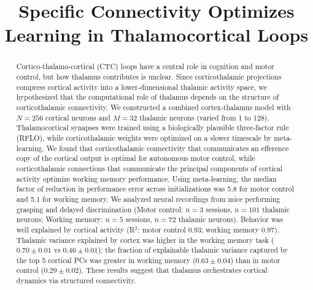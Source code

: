 \documentclass[11pt]{article}
\title{Specific Connectivity Optimizes Learning in Thalamocortical Loops}
\author{}
\date{}
\begin{document}
\maketitle

\begin{abstract}
Cortico-thalamo-cortical (CTC) loops have a central role in cognition and motor control, but how thalamus contributes is unclear. Since corticothalamic projections compress cortical activity into a lower-dimensional thalamic activity space, we hypothesized that the computational role of thalamus depends on the structure of corticothalamic connectivity. We constructed a combined cortex-thalamus model with $N = 256$ cortical neurons and $M = 32$ thalamic neurons (varied from 1 to 128). Thalamocortical synapses were trained using a biologically plausible three-factor rule (RFLO), while corticothalamic weights were optimized on a slower timescale by meta-learning. We found that corticothalamic connectivity that communicates an efference copy of the cortical output is optimal for autonomous motor control, while corticothalamic connections that communicate the principal components of cortical activity optimize working memory performance. Using meta-learning, the median factor of reduction in performance error across initializations was 5.8 for motor control and 5.1 for working memory. We analyzed neural recordings from mice performing grasping and delayed discrimination (Motor control: $n=3$ sessions, $n=101$ thalamic neurons; Working memory: $n=5$ sessions, $n=72$ thalamic neurons). Behavior was well explained by cortical activity (R$^2$: motor control 0.93; working memory 0.97). Thalamic variance explained by cortex was higher in the working memory task ($0.70 \pm 0.01$ vs $0.46 \pm 0.01$); the fraction of explainable thalamic variance captured by the top 5 cortical PCs was greater in working memory ($0.63 \pm 0.04$) than in motor control ($0.29 \pm 0.02$). These results suggest that thalamus orchestrates cortical dynamics via structured connectivity.
\end{abstract}
\end{document}
